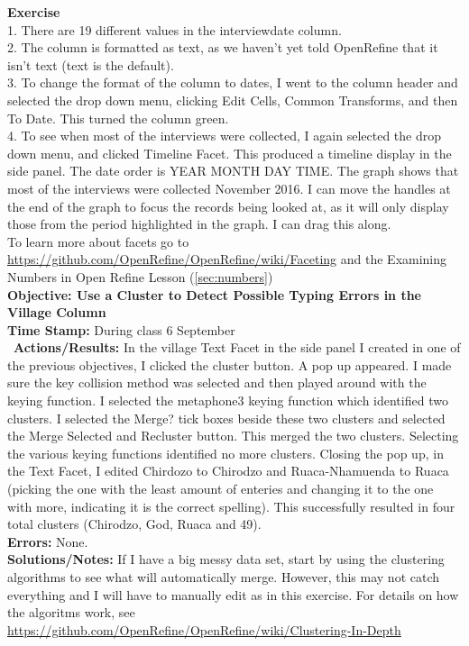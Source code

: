 \documentclass{article}
\begin{document}
\begin{FlushLeft}
\vspace{5mm}
\textbf{Exercise}\\ 
1. There are 19 different values in the interview\textunderscore date column.\\
2. The column is formatted as text, as we haven't yet told OpenRefine that it isn't text (text is the default).\\
3. To change the format of the column to dates, I went to the column header and selected the drop down menu, clicking Edit Cells, Common Transforms, and then To Date. This turned the column green.\\
4. To see when most of the interviews were collected, I again selected the drop down menu, and clicked Timeline Facet. This produced a timeline display in the side panel. The date order is YEAR MONTH DAY TIME. The graph shows that most of the interviews were collected November 2016. I can move the handles at the end of the graph to focus the records being looked at, as it will only display those from the period highlighted in the graph. I can drag this along.\\
To learn more about facets go to \url{https://github.com/OpenRefine/OpenRefine/wiki/Faceting} and the Examining Numbers in Open Refine Lesson (\autoref{sec:numbers})\\
\vspace{5mm}
\textbf{Objective: Use a Cluster to Detect Possible Typing Errors in the Village Column}\\ 
\textbf{Time Stamp:} During class 6 September\\\
\textbf{Actions/Results:} In the village Text Facet in the side panel I created in one of the previous objectives, I clicked the cluster button. A pop up appeared. I made sure the key collision method was selected and then played around with the keying function. I selected the metaphone3 keying function which identified two clusters. I selected the Merge? tick boxes beside these two clusters and selected the Merge Selected and Recluster button. This merged the two clusters. Selecting the various keying functions identified no more clusters. Closing the pop up, in the Text Facet, I edited Chirdozo to Chirodzo and Ruaca-Nhamuenda to Ruaca (picking the one with the least amount of enteries and changing it to the one with more, indicating it is the correct spelling). This successfully resulted in four total clusters (Chirodzo, God, Ruaca and 49). \\
\textbf{Errors:} None.\\
\textbf{Solutions/Notes:} If I have a big messy data set, start by using the clustering algorithms to see what will automatically merge. However, this may not catch everything and I will have to manually edit as in this exercise. For details on how the algoritms work, see \url{https://github.com/OpenRefine/OpenRefine/wiki/Clustering-In-Depth}\\

\end{FlushLeft}
\end{document}
